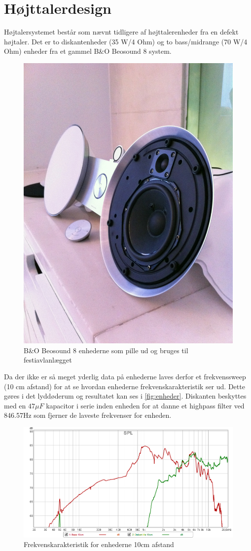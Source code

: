 \section{Højttalerdesign}
Højtalersystemet består som nævnt tidligere af højttalerenheder fra en defekt højtaler. Det er to diskantenheder (35 W/4 Ohm) og to bass/midrange (70 W/4 Ohm) enheder fra et gammel B\&O Beosound 8 system. 
\begin{figure}[H] 
	\center
		\includegraphics[width=.4\linewidth]{figur/bs8_enheder}\quad
		\caption{B\&O Beosound 8 enhederne som pille ud og bruges til festiavlanlægget}
		\label{fig:speakers}
\end{figure}

Da der ikke er så meget yderlig data på enhederne laves derfor et frekvenssweep (10 cm afstand) for at se hvordan enhederne frekvenskarakteristik ser ud. Dette gøres i det lyddøderum og resultatet kan ses i \autoref{fig:enheder}. Diskanten beskyttes med en $47\mu F$ kapacitor i serie inden enheden for at danne et highpass filter ved 846.57Hz som fjerner de laveste frekvenser for enheden.

\begin{figure}[H] 
	\center
		\includegraphics[width=.9\linewidth]{figur/Enheder-10cm}\quad
		\caption{Frekvenskarakteristik for enhederne 10cm afstand}
		\label{fig:enheder}
\end{figure}

